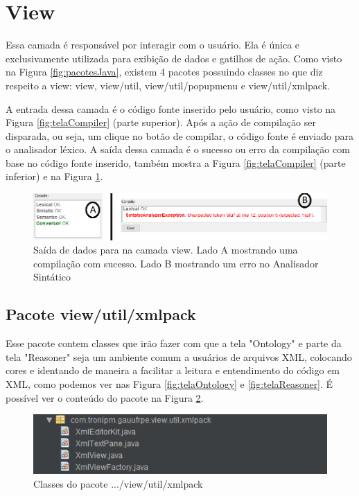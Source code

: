 \documentclass{bcc}
\begin{document}
\section{View}
Essa camada é responsável por interagir com o usuário. Ela é única e exclusivamente utilizada para exibição de dados e gatilhos de ação. Como visto na Figura \ref{fig:pacotesJava}, existem 4 pacotes possuindo classes no que diz respeito a view: view, view/util, view/util/popupmenu e view/util/xmlpack.

A entrada dessa camada é o código fonte inserido pelo usuário, como visto na Figura \ref{fig:telaCompiler} (parte superior). Após a ação de compilação ser disparada, ou seja, um clique no botão de compilar, o código  fonte é enviado para o analisador léxico. A saída dessa camada é o sucesso ou erro da compilação com base no código fonte inserido, também mostra a Figura \ref{fig:telaCompiler} (parte inferior) e na Figura \ref{fig:telaCompilerSaida}.
\begin{figure}[H]
\centering
\includegraphics[width=.7\textwidth]{Figuras/tela_compiler_saida.png}
\caption{Saída de dados para na camada view. Lado A mostrando uma compilação com sucesso. Lado B mostrando um erro no Analisador Sintático}
\label{fig:telaCompilerSaida}
\end{figure}

\subsection{Pacote view/util/xmlpack}
Esse pacote contem classes que irão fazer com que a tela "Ontology" e parte da tela "Reasoner" seja um ambiente comum a usuários de arquivos XML, colocando cores e identando de maneira a facilitar a leitura e entendimento do código em XML, como podemos ver nas Figura \ref{fig:telaOntology} e \ref{fig:telaReasoner}. É possível ver o conteúdo do pacote na Figura \ref{fig:pacoteXmlpack}.
\begin{figure}[H]
\centering
\includegraphics[width=.6\textwidth]{Figuras/pacote_xmlpack.png}
\caption{Classes do pacote .../view/util/xmlpack}
\label{fig:pacoteXmlpack}
\end{figure}
\end{document}
